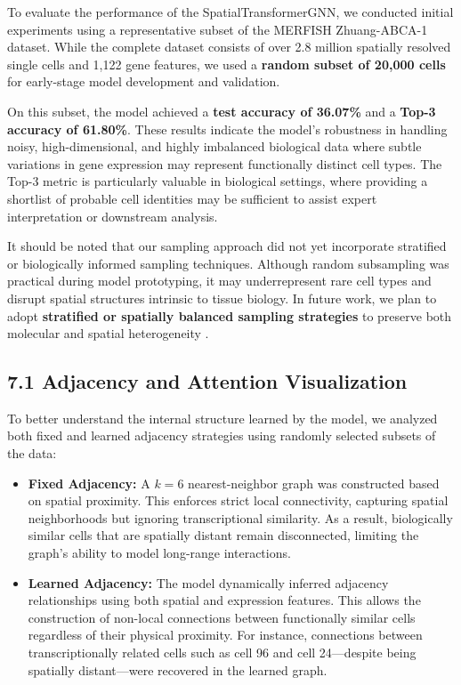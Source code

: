 \documentclass[unnumsec,webpdf,contemporary,medium]{oup-authoring-template}
\begin{document}
To evaluate the performance of the SpatialTransformerGNN, we conducted initial experiments using a representative subset of the MERFISH Zhuang-ABCA-1 dataset. While the complete dataset consists of over 2.8 million spatially resolved single cells and 1,122 gene features, we used a \textbf{random subset of 20,000 cells} for early-stage model development and validation.

On this subset, the model achieved a \textbf{test accuracy of 36.07\%} and a \textbf{Top-3 accuracy of 61.80\%}. These results indicate the model’s robustness in handling noisy, high-dimensional, and highly imbalanced biological data where subtle variations in gene expression may represent functionally distinct cell types. The Top-3 metric is particularly valuable in biological settings, where providing a shortlist of probable cell identities may be sufficient to assist expert interpretation or downstream analysis.

It should be noted that our sampling approach did not yet incorporate stratified or biologically informed sampling techniques. Although random subsampling was practical during model prototyping, it may underrepresent rare cell types and disrupt spatial structures intrinsic to tissue biology. In future work, we plan to adopt \textbf{stratified or spatially balanced sampling strategies} to preserve both molecular and spatial heterogeneity \cite{luecken2022benchmarking}.

\subsection*{7.1 Adjacency and Attention Visualization}

To better understand the internal structure learned by the model, we analyzed both fixed and learned adjacency strategies using randomly selected subsets of the data:
\begin{itemize}
    \item \textbf{Fixed Adjacency:} A $k=6$ nearest-neighbor graph was constructed based on spatial proximity. This enforces strict local connectivity, capturing spatial neighborhoods but ignoring transcriptional similarity. As a result, biologically similar cells that are spatially distant remain disconnected, limiting the graph's ability to model long-range interactions.
    
    \item \textbf{Learned Adjacency:} The model dynamically inferred adjacency relationships using both spatial and expression features. This allows the construction of non-local connections between functionally similar cells regardless of their physical proximity. For instance, connections between transcriptionally related cells such as cell 96 and cell 24—despite being spatially distant—were recovered in the learned graph.
\end{itemize}
\end{document}
